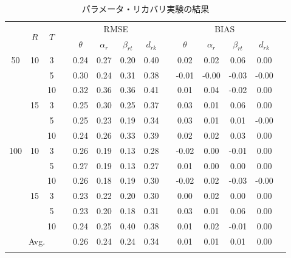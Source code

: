 \documentclass[a4paper,11pt,oneside,openany]{jsbook}
\newcommand{\bhline}[1]{\noalign{\hrule height #1}}
\begin{document}
\begin{table}[tb]
\begin{center}
\caption{パラメータ・リカバリ実験の結果}
\setlength{\tabcolsep}{5.pt}
\begin{tabular}{cccccccccccccc}  
\bhline{1pt}
\multirow{2}{*}{$J$} & \multirow{2}{*}{$R$} & \multirow{2}{*}{$T$}  && \multicolumn{4}{c}{RMSE} &&   \multicolumn{4}{c}{BIAS}  \\
\cline{5-8}\cline{10-13}
  & & & & $\theta$ & $\alpha_r$ & $\beta_{rt}$ & $d_{rk}$ &  & $\theta$ & $\alpha_r$ & $\beta_{rt}$ & $d_{rk}$ \\
\bhline{1pt}
50 & 10 & 3 & & 0.24 & 0.27 & 0.20 & 0.40 & &0.02  & 0.02 & 0.06  & 0.00 \\
   &   & 5  && 0.30 & 0.24 & 0.31 & 0.38 & &-0.01 & -0.00 & -0.03 & -0.00  \\
   &   & 10 && 0.32 & 0.36 & 0.36 & 0.41 && 0.01  & 0.04 & -0.02 & 0.00 \\
\cline{2-14}
 & 15 & 3  && 0.25 & 0.30 & 0.25 & 0.37 && 0.03 & 0.01 & 0.06 & 0.00  \\
 &  & 5  && 0.25 & 0.23 & 0.19 & 0.34 && 0.03 & 0.01 & 0.01 & -0.00  \\
 &  & 10 && 0.24 & 0.26 & 0.33 & 0.39 && 0.02 & 0.02 & 0.03 & 0.00 \\
\hline
100 & 10 & 3  && 0.26 & 0.19 & 0.13 & 0.28 && -0.02 & 0.00 & -0.01 & 0.00  \\
 &  & 5  && 0.27 & 0.19 & 0.13 & 0.27 && 0.01  & 0.00 & 0.00  & 0.00  \\
 &  & 10 && 0.26 & 0.18 & 0.19 & 0.30 && -0.02 & 0.02 & -0.03 & -0.00 \\
\cline{2-14}
 & 15 & 3  && 0.23 & 0.22 & 0.20 & 0.30 && 0.00 & 0.02 & 0.00 &0.00 \\
 &  & 5  && 0.23 & 0.20 & 0.18 & 0.31 && 0.03 & 0.01 & 0.06  &0.00\\
 &  & 10 && 0.24 & 0.25 & 0.40 & 0.38 && 0.01 & 0.02 & -0.01 &0.00\\
\hline
\multicolumn{4}{c}{Avg.}   &  0.26 & 0.24 & 0.24 & 0.34 &  & 0.01 & 0.01 & 0.01 & 0.00 & \\
\bhline{1pt}
\end{tabular}
\label{parameters_recovery}
\end{center}
\end{table}
\end{document}

